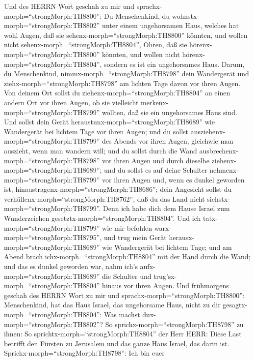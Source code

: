  Und des HERRN Wort geschah zu mir und
sprachx-morph=``strongMorph:TH8800'':  Du Menschenkind, du
wohnstx-morph=``strongMorph:TH8802'' unter einem ungehorsamen Haus,
welches hat wohl Augen, daß sie sehenx-morph=``strongMorph:TH8800''
könnten, und wollen nicht sehenx-morph=``strongMorph:TH8804'', Ohren,
daß sie hörenx-morph=``strongMorph:TH8800'' könnten, und wollen nicht
hörenx-morph=``strongMorph:TH8804'', sondern es ist ein ungehorsames
Haus.  Darum, du Menschenkind,
nimmx-morph=``strongMorph:TH8798'' dein Wandergerät und
ziehx-morph=``strongMorph:TH8798'' am lichten Tage davon vor ihren
Augen. Von deinem Ort sollst du ziehenx-morph=``strongMorph:TH8804'' an
einen andern Ort vor ihren Augen, ob sie vielleicht
merkenx-morph=``strongMorph:TH8799'' wollten, daß sie ein ungehorsames
Haus sind.  Und sollst dein Gerät
heraustunx-morph=``strongMorph:TH8689'' wie Wandergerät bei lichtem Tage
vor ihren Augen; und du sollst ausziehenx-morph=``strongMorph:TH8799''
des Abends vor ihren Augen, gleichwie man auszieht, wenn man wandern
will;  und du sollst durch die Wand
ausbrechenx-morph=``strongMorph:TH8798'' vor ihren Augen und durch
dieselbe ziehenx-morph=``strongMorph:TH8689'';  und du
sollst es auf deine Schulter nehmenx-morph=``strongMorph:TH8799'' vor
ihren Augen und, wenn es dunkel geworden ist,
hinaustragenx-morph=``strongMorph:TH8686''; dein Angesicht sollst du
verhüllenx-morph=``strongMorph:TH8762'', daß du das Land nicht
siehstx-morph=``strongMorph:TH8799''. Denn ich habe dich dem Hause
Israel zum Wunderzeichen gesetztx-morph=``strongMorph:TH8804''.
 Und ich tatx-morph=``strongMorph:TH8799'' wie mir befohlen
warx-morph=``strongMorph:TH8795'', und trug mein Gerät
herausx-morph=``strongMorph:TH8689'' wie Wandergerät bei lichtem Tage;
und am Abend brach ichx-morph=``strongMorph:TH8804'' mit der Hand durch
die Wand; und das es dunkel geworden war, nahm ich's
aufx-morph=``strongMorph:TH8689'' die Schulter und
trug'sx-morph=``strongMorph:TH8804'' hinaus vor ihren Augen.
 Und frühmorgens geschah des HERRN Wort zu mir und
sprachx-morph=``strongMorph:TH8800'':  Menschenkind, hat das
Haus Israel, das ungehorsame Haus, nicht zu dir
gesagtx-morph=``strongMorph:TH8804'': Was machst
dux-morph=``strongMorph:TH8802''?  So
sprichx-morph=``strongMorph:TH8798'' zu ihnen: So
sprichtx-morph=``strongMorph:TH8804'' der Herr HERR: Diese Last betrifft
den Fürsten zu Jerusalem und das ganze Haus Israel, das darin ist.
 Sprichx-morph=``strongMorph:TH8798'': Ich bin euer

